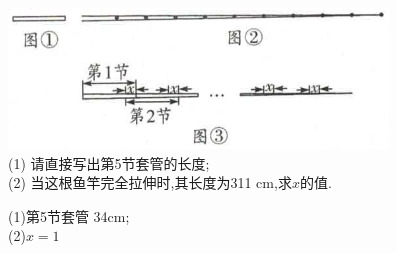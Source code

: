 \documentclass[cn,blue,12pt]{elegantbook}
\begin{document}
\begin{zhenti}[resume]
\includegraphics[width=0.7\linewidth]{pic/20200531004.png}\\
(1) 请直接写出第5节套管的长度;\\
(2) 当这根鱼竿完全拉伸时,其长度为311 cm,求\(x\)的值.
\begin{solution}
    (1)第5节套管 34cm;\\
    (2)\(x=1\)
\end{solution}
\end{zhenti}
\end{document}
